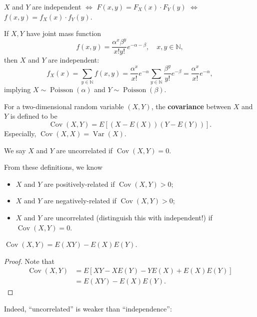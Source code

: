 \documentclass[11pt,singlecolumn, openany, citestyle=authoryear]{elegantbook}
\begin{document}
\begin{CJK}{UTF8}{gbsn}
\begin{remark}
    $X$ and $Y$ are independent $\iff$ $F(x,y)=F_X(x)\cdot F_Y(y)$ $\iff$
    $f(x,y)=f_X(x)\cdot f_Y(y)$.
\end{remark}
\begin{example}
    If $X,Y$ have joint mass function 
    $$
    f(x,y)=\frac{\alpha^x \beta^y}{x!y!}e^{-\alpha-\beta}, \quad x,y\in\mathbb{N},
    $$
    then $X$ and $Y$ are independent:
    $$
    f_X(x)=\sum_{y\in\mathbb{N}}f(x,y)=\frac{\alpha^x}{x!}e^{-\alpha}\sum_{y\in\mathbb{N}}
    \frac{\beta^y}{y!}e^{-\beta}=\frac{\alpha^x}{x!}e^{-\alpha},
    $$
    implying $X\sim \operatorname{Poisson}(\alpha)$ and $Y\sim\operatorname{Poisson}(\beta)$.
\end{example}

\begin{definition}
    For a two-dimensional random variable $(X,Y)$, the \textbf{covariance} between 
    $X$ and $Y$ is defined to be 
    \begin{equation}
        \operatorname{Cov}(X,Y)=E[(X-E(X))(Y-E(Y))].
    \end{equation}
    Especially, $\operatorname{Cov}(X,X)=\operatorname{Var}(X)$.
\end{definition}
\begin{definition}
    We say $X$ and $Y$ are uncorrelated if $\operatorname{Cov}(X,Y)=0$.
\end{definition}
From these definitions, we know 
\begin{itemize}
    \item $X$ and $Y$ are positively-related if $\operatorname{Cov}(X,Y)>0$;
    \item $X$ and $Y$ are negatively-related if $\operatorname{Cov}(X,Y)>0$;
    \item $X$ and $Y$ are uncorrelated (distinguish this with independent!) if $\operatorname{Cov}(X,Y)=0$.
\end{itemize}
\begin{property}
    $\operatorname{Cov}(X,Y)=E(XY)-E(X)E(Y)$.
\end{property}
\begin{proof}
    Note that 
    \begin{align*}
        \operatorname{Cov}(X,Y)&=E[XY-XE(Y)-YE(X)+E(X)E(Y)]\\
        &=E(XY)-E(X)E(Y).
    \end{align*}
\end{proof}
Indeed, ``uncorrelated'' is weaker than ``independence'':
\begin{property}

\end{property}
\end{CJK}
\end{document}

